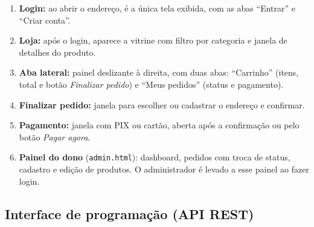 \documentclass[12pt]{article}
\begin{document}
\begin{enumerate}
\item \textbf{Login:} ao abrir o endereço, é a única tela exibida, com as abas ``Entrar'' e ``Criar conta''.
\item \textbf{Loja:} após o login, aparece a vitrine com filtro por categoria e janela de detalhes do produto.
\item \textbf{Aba lateral:} painel deslizante à direita, com duas abas: ``Carrinho'' (itens, total e botão \textit{Finalizar pedido}) e ``Meus pedidos'' (status e pagamento).
\item \textbf{Finalizar pedido:} janela para escolher ou cadastrar o endereço e confirmar.
\item \textbf{Pagamento:} janela com PIX ou cartão, aberta após a confirmação ou pelo botão \textit{Pagar agora}.
\item \textbf{Painel do dono} (\texttt{admin.html}): dashboard, pedidos com troca de status, cadastro e edição de produtos. O administrador é levado a esse painel ao fazer login.
\end{enumerate}

\subsection{Interface de programação (API REST)}
\end{document}
